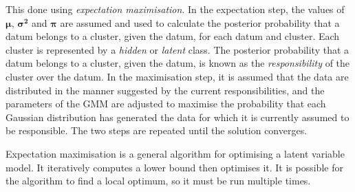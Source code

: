 This done using \emph{expectation maximisation}.
In the expectation step, the values of \( \boldsymbol{\mu} \), \( \boldsymbol{\sigma^{2}} \) and \( \boldsymbol{\pi} \) are assumed and used to calculate the posterior probability that a datum belongs to a cluster, given the datum, for each datum and cluster.
Each cluster is represented by a \emph{hidden} or \emph{latent} class.
The posterior probability that a datum belongs to a cluster, given the datum, is known as the \emph{responsibility} of the cluster over the datum.
In the maximisation step, it is assumed that the data are distributed in the manner suggested by the current responsibilities, and the parameters of the GMM are adjusted to maximise the probability that each Gaussian distribution has generated the data for which it is currently assumed to be responsible.
The two steps are repeated until the solution converges.

Expectation maximisation is a general algorithm for optimising a latent variable model.
It iteratively computes a lower bound then optimises it.
It is possible for the algorithm to find a local optimum, so it must be run multiple times.
